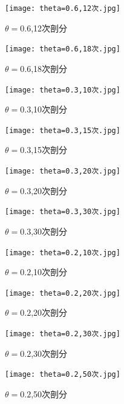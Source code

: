 \documentclass[12pt]{ctexart}
\begin{document}
\begin{figure}[H]
	\centering
	\begin{minipage}[t]{0.48\textwidth}
		\centering
		\texttt{[image: theta=0.6,12次.jpg]}
		\caption{$\theta=0.6$,12次剖分}
	\end{minipage}
	\begin{minipage}[t]{0.48\textwidth}
		\centering
		\texttt{[image: theta=0.6,18次.jpg]}
		\caption{$\theta=0.6$,18次剖分}
	\end{minipage}
\end{figure}
\begin{figure}[H]
	\centering
	\begin{minipage}[t]{0.48\textwidth}
		\centering
		\texttt{[image: theta=0.3,10次.jpg]}
		\caption{$\theta=0.3$,10次剖分}
	\end{minipage}
	\begin{minipage}[t]{0.48\textwidth}
		\centering
		\texttt{[image: theta=0.3,15次.jpg]}
		\caption{$\theta=0.3$,15次剖分}
	\end{minipage}
\end{figure}
\begin{figure}[H]
	\centering
	\begin{minipage}[t]{0.48\textwidth}
		\centering
		\texttt{[image: theta=0.3,20次.jpg]}
		\caption{$\theta=0.3$,20次剖分}
	\end{minipage}
	\begin{minipage}[t]{0.48\textwidth}
		\centering
		\texttt{[image: theta=0.3,30次.jpg]}
		\caption{$\theta=0.3$,30次剖分}
	\end{minipage}
\end{figure}
\begin{figure}[H]
	\centering
	\begin{minipage}[t]{0.48\textwidth}
		\centering
		\texttt{[image: theta=0.2,10次.jpg]}
		\caption{$\theta=0.2$,10次剖分}
	\end{minipage}
	\begin{minipage}[t]{0.48\textwidth}
		\centering
		\texttt{[image: theta=0.2,20次.jpg]}
		\caption{$\theta=0.2$,20次剖分}
	\end{minipage}
\end{figure}
\begin{figure}[H]
	\centering
	\begin{minipage}[t]{0.48\textwidth}
		\centering
		\texttt{[image: theta=0.2,30次.jpg]}
		\caption{$\theta=0.2$,30次剖分}
	\end{minipage}
	\begin{minipage}[t]{0.48\textwidth}
		\centering
		\texttt{[image: theta=0.2,50次.jpg]}
		\caption{$\theta=0.2$,50次剖分}
	\end{minipage}
\end{figure}
\end{document}
